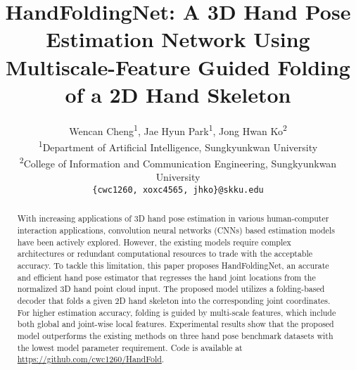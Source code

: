 \documentclass[10pt,twocolumn,letterpaper]{article}
\begin{document}
\title{HandFoldingNet: A 3D Hand Pose Estimation Network Using Multiscale-Feature Guided Folding of a 2D Hand Skeleton}





















\author{Wencan Cheng\textsuperscript{1},  Jae Hyun Park\textsuperscript{1},  Jong Hwan Ko\textsuperscript{2}\footnotemark[1]\\
\textsuperscript{1}Department of Artificial Intelligence, Sungkyunkwan University\\
\textsuperscript{2}College of Information and Communication Engineering, Sungkyunkwan University\\
{\tt\small \{cwc1260, xoxc4565, jhko\}@skku.edu}
}


\maketitle
\ificcvfinal\thispagestyle{fancy}\fi
{}
\rhead{}
\cfoot{}
\renewcommand{\thefootnote}{\fnsymbol{footnote}} 

\begin{abstract}
With increasing applications of 3D hand pose estimation in various human-computer interaction applications, convolution neural networks (CNNs) based estimation models have been actively explored. However, the existing models require complex architectures or redundant computational resources to trade with the acceptable accuracy. To tackle this limitation, this paper proposes HandFoldingNet, an accurate and efficient hand pose estimator that regresses the hand joint locations from the normalized 3D hand point cloud input. The proposed model utilizes a folding-based decoder that folds a given 2D hand skeleton into the corresponding joint coordinates. For higher estimation accuracy, folding is guided by multi-scale features, which include both global and joint-wise local features. Experimental results show that the proposed model outperforms the existing methods on three hand pose benchmark datasets with the lowest model parameter requirement. 
Code is available at \url{https://github.com/cwc1260/HandFold}.




\end{abstract}
\end{document}

